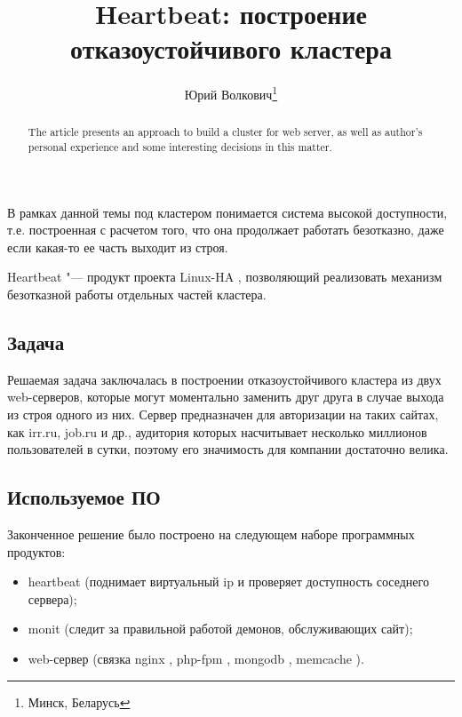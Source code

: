 \documentclass[10pt, a5paper]{article}
\begin{document}
\title{Heartbeat: построение отказоустойчивого кластера}%

\author{Юрий Волкович\footnote{Минск, Беларусь}}
\maketitle

\begin{abstract}
The article presents an approach to build a cluster for web server, as well as author's personal experience and some \linebreak interesting decisions in this matter.
\end{abstract}

В рамках данной темы под кластером понимается система высокой доступности,
т.е. построенная с расчетом того, что она продолжает работать безотказно,
даже если какая-то ее часть выходит из строя.

Heartbeat "--- продукт проекта Linux-HA \cite{Volkovich1}, позволяющий реализовать механизм безотказной работы отдельных частей кластера.

\subsection*{Задача}

Решаемая задача заключалась в построении отказоустойчивого кластера из двух web-серверов, которые могут моментально заменить друг друга в случае выхода из строя одного из них. Сервер предназначен для авторизации на таких сайтах, как irr.ru, job.ru и др., аудитория которых насчитывает несколько миллионов пользователей в сутки, поэтому его значимость для компании достаточно велика.

\subsection*{Используемое ПО}

Законченное решение было построено на следующем наборе программных продуктов:

\begin{itemize}
  \item heartbeat (поднимает виртуальный ip и проверяет доступность соседнего сервера);
  \item monit \cite{Volkovich2} (следит за правильной работой демонов, обслуживающих сайт);
  \item web-сервер (связка nginx \cite{Volkovich3}, php-fpm \cite{Volkovich4}, mongodb \cite{Volkovich5}, \linebreak memcache \cite{Volkovich6}).
\end{itemize}
\end{document}
